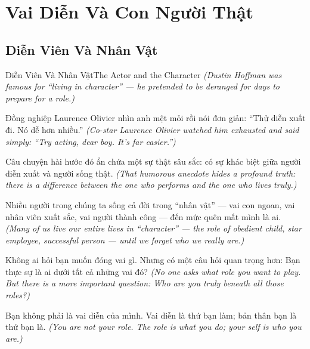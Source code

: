 \chapter{Vai Diễn Và Con Người Thật}

\section{Diễn Viên Và Nhân Vật}
\begin{truyen}{Diễn Viên Và Nhân Vật}{The Actor and the Character}
\textit{(Dustin Hoffman was famous for ``living in character'' — he pretended to be deranged for days to prepare for a role.)}

Đồng nghiệp Laurence Olivier nhìn anh mệt mỏi rồi nói đơn giản: ``Thử diễn xuất đi. Nó dễ hơn nhiều.''
\textit{(Co-star Laurence Olivier watched him exhausted and said simply: ``Try acting, dear boy. It's far easier.'')}

Câu chuyện hài hước đó ẩn chứa một sự thật sâu sắc: có sự khác biệt giữa người diễn xuất và người sống thật.
\textit{(That humorous anecdote hides a profound truth: there is a difference between the one who performs and the one who lives truly.)}

Nhiều người trong chúng ta sống cả đời trong ``nhân vật'' — vai con ngoan, vai nhân viên xuất sắc, vai người thành công — đến mức quên mất mình là ai.
\textit{(Many of us live our entire lives in ``character'' — the role of obedient child, star employee, successful person — until we forget who we really are.)}

Không ai hỏi bạn muốn đóng vai gì. Nhưng có một câu hỏi quan trọng hơn: Bạn thực sự là ai dưới tất cả những vai đó?
\textit{(No one asks what role you want to play. But there is a more important question: Who are you truly beneath all those roles?)}

\end{truyen}

\begin{baihoc}
Bạn không phải là vai diễn của mình. Vai diễn là thứ bạn làm; bản thân bạn là thứ bạn là.
\textit{(You are not your role. The role is what you do; your self is who you are.)}
\end{baihoc}
\ngancach

